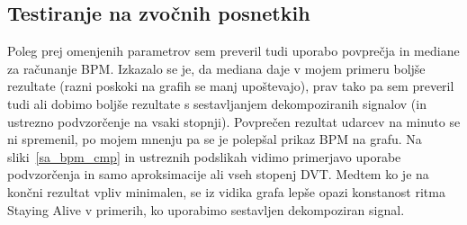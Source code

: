 \documentclass[a4paper,11pt]{article}
\begin{document}
\subsection{Testiranje na zvočnih posnetkih}

Poleg prej omenjenih parametrov sem preveril tudi uporabo povprečja in mediane za računanje BPM. Izkazalo se je, da mediana daje v mojem primeru boljše rezultate (razni poskoki na grafih se manj upoštevajo), prav tako pa sem preveril tudi ali dobimo boljše rezultate s sestavljanjem dekompoziranih signalov (in ustrezno podvzorčenje na vsaki stopnji). Povprečen rezultat udarcev na minuto se ni spremenil, po mojem mnenju pa se je polepšal prikaz BPM na grafu. Na sliki~\ref{sa_bpm_cmp} in ustreznih podslikah vidimo primerjavo uporabe podvzorčenja in samo aproksimacije ali vseh stopenj DVT. Medtem ko je na končni rezultat vpliv minimalen, se iz vidika grafa lepše opazi konstanost ritma Staying Alive v primerih, ko uporabimo sestavljen dekompoziran signal.
\end{document}
